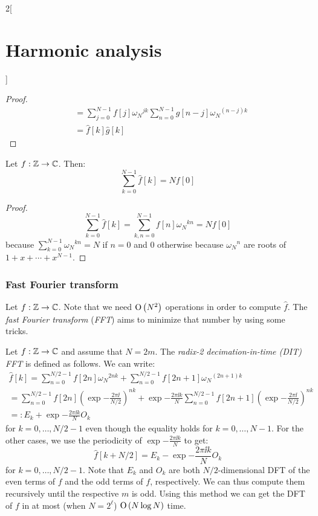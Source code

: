 \documentclass[../../../main_math.tex]{subfiles}
\begin{document}
\begin{multicols}{2}[\section{Harmonic analysis}]
\begin{proof}
\begin{align*}
                       & =\sum_{j=0}^{N-1}f[j]{\omega_N}^{jk}\sum_{n=0}^{N-1}g[n-j]{\omega_N}^{(n-j)k} \\
                       & =\widehat{f}[k]\widehat{g}[k]
    \end{align*}
  \end{proof}
  \begin{theorem}
    Let $f:\mathbb{Z}\rightarrow\mathbb{C}$. Then:
    $$\sum_{k=0}^{N-1}\widehat{f}[k]=Nf[0]$$
  \end{theorem}
  \begin{proof}
    $$\sum_{k=0}^{N-1}\widehat{f}[k]=\sum_{k,n=0}^{N-1}f[n]{\omega_N}^{kn}=Nf[0]$$
    because $\sum_{k=0}^{N-1}{\omega_N}^{kn}=N$ if $n=0$ and 0 otherwise because ${\omega_N}^{n}$ are roots of $1+x+\cdots+x^{N-1}$.
  \end{proof}
  \subsubsection{Fast Fourier transform}
  \begin{definition}
    Let $f:\mathbb{Z}\rightarrow\mathbb{C}$. Note that we need $\mathrm{O}\left(N^2\right)$ operations in order to compute $\widehat{f}$. The \emph{fast Fourier transform} (\emph{FFT}) aims to minimize that number by using some tricks.
  \end{definition}
  \begin{definition}
    Let $f:\mathbb{Z}\rightarrow\mathbb{C}$ and assume that $N=2m$. The \emph{radix-2 decimation-in-time (DIT) FFT} is defined as follows. We can write:
    \begin{multline*}
      \widehat{f}[k] =\sum_{n=0}^{N/2-1}f[2n]{\omega_N}^{2nk}+\sum_{n=0}^{N/2-1}f[2n+1]{\omega_N}^{(2n+1)k}    \\ =\!\sum_{n=0}^{N/2-1}\!f[2n]{\left(\exp{-\frac{2\pi\ii}{N/2}}\right)}^{nk}\!+\exp{-\frac{2\pi\ii k}{N}}\!\sum_{n=0}^{N/2-1}\!f[2n+1]{\left(\exp{-\frac{2\pi\ii}{N/2}}\right)}^{nk} \\
      =:E_k+\exp{-\frac{2\pi\ii k}{N}}O_k
    \end{multline*}
    for $k=0,\ldots,N/2-1$ even though the equality holds for $k=0,\ldots,N-1$. For the other cases, we use the periodicity of $\exp{-\frac{2\pi\ii k}{N}}$ to get:
    $$\widehat{f}[k+N/2] =E_k-\exp{-\frac{2\pi\ii k}{N}}O_k$$
    for $k=0,\ldots,N/2-1$.
    Note that $E_k$ and $O_k$ are both $N/2$-dimensional DFT of the even terms of $f$ and the odd terms of $f$, respectively. We can thus compute them recursively until the respective $m$ is odd. Using this method we can get the DFT of $f$ in at most (when $N=2^\ell$) $\mathrm{O}\left(N\log N\right)$ time.
  \end{definition}

\end{multicols}
\end{document}
